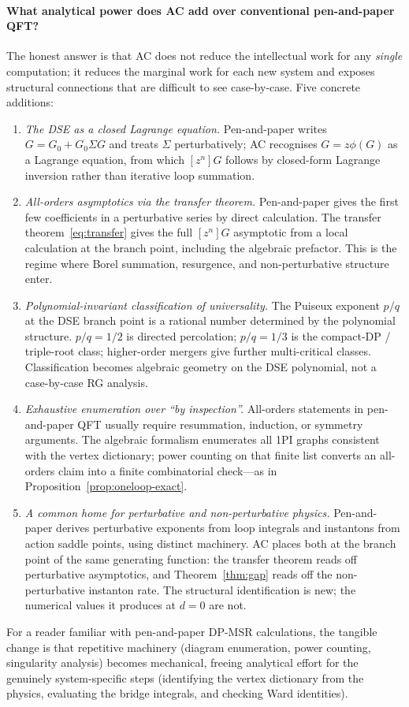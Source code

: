 \documentclass[11pt,a4paper]{article}
\theoremstyle{plain}
\begin{document}
\paragraph{What analytical power does AC add over conventional
pen-and-paper QFT?}
The honest answer is that AC does not reduce the intellectual work
for any \emph{single} computation; it reduces the marginal work
for each new system and exposes structural connections that are
difficult to see case-by-case.  Five concrete additions:
\begin{enumerate}[leftmargin=1.8em, itemsep=-0.2em]
\item \textit{The DSE as a closed Lagrange equation.}
  Pen-and-paper writes $G = G_0 + G_0\Sigma G$ and treats $\Sigma$
  perturbatively; AC recognises $G = z\phi(G)$ as a Lagrange
  equation, from which $[z^n]G$ follows by closed-form Lagrange
  inversion rather than iterative loop summation.
\item \textit{All-orders asymptotics via the transfer theorem.}
  Pen-and-paper gives the first few coefficients in a perturbative
  series by direct calculation.  The transfer theorem~\eqref{eq:transfer}
  gives the full $[z^n]G$ asymptotic from a local calculation at
  the branch point, including the algebraic prefactor.  This is
  the regime where Borel summation, resurgence, and
  non-perturbative structure enter.
\item \textit{Polynomial-invariant classification of universality.}
  The Puiseux exponent $p/q$ at the DSE branch point is a rational
  number determined by the polynomial structure.  $p/q = 1/2$ is
  directed percolation; $p/q = 1/3$ is the compact-DP / triple-root
  class; higher-order mergers give further multi-critical
  classes.  Classification becomes algebraic geometry on the DSE
  polynomial, not a case-by-case RG analysis.
\item \textit{Exhaustive enumeration over ``by inspection''.}
  All-orders statements in pen-and-paper QFT usually require
  resummation, induction, or symmetry arguments.  The algebraic
  formalism enumerates all 1PI graphs consistent with the vertex
  dictionary; power counting on that finite list converts an
  all-orders claim into a finite combinatorial check---as in
  Proposition~\ref{prop:oneloop-exact}.
\item \textit{A common home for perturbative and non-perturbative
  physics.}
  Pen-and-paper derives perturbative exponents from loop integrals
  and instantons from action saddle points, using distinct
  machinery.  AC places both at the branch point of the same
  generating function: the transfer theorem reads off perturbative
  asymptotics, and Theorem~\ref{thm:gap} reads off the
  non-perturbative instanton rate.  The structural identification
  is new; the numerical values it produces at $d = 0$ are not.
\end{enumerate}
For a reader familiar with pen-and-paper DP-MSR calculations, the
tangible change is that repetitive machinery (diagram
enumeration, power counting, singularity analysis) becomes
mechanical, freeing analytical effort for the genuinely
system-specific steps (identifying the vertex dictionary from the
physics, evaluating the bridge integrals, and checking Ward
identities).
\end{document}
